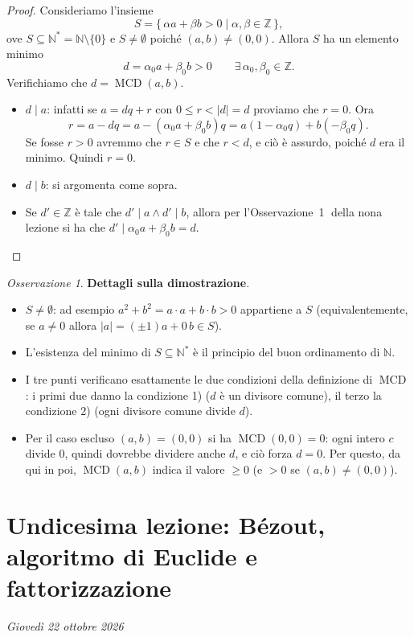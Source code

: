 \documentclass[11pt,a4paper]{article}
\newcommand{\N}{\mathbb{N}}
\newcommand{\Z}{\mathbb{Z}}
\theoremstyle{definition}
\theoremstyle{plain}
\theoremstyle{remark}
\newtheorem*{osservazione}{Osservazione}
\begin{document}
\begin{proof}
Consideriamo l'insieme
\[
S=\{\,\alpha a+\beta b>0\mid\alpha,\beta\in\Z\,\},
\]
ove $S\subseteq\N^*=\N\setminus\{0\}$ e $S\neq\emptyset$ poiché $(a,b)\neq(0,0)$. Allora $S$ ha un elemento minimo
\[
d=\alpha_0a+\beta_0b>0\qquad\exists\,\alpha_0,\beta_0\in\Z .
\]
Verifichiamo che $d=\operatorname{MCD}(a,b)$.
\begin{itemize}
\item $d\mid a$: infatti se $a=dq+r$ con $0\le r<|d|=d$ proviamo che $r=0$. Ora
\[
r=a-dq=a-(\alpha_0a+\beta_0b)q=a(1-\alpha_0q)+b(-\beta_0q).
\]
Se fosse $r>0$ avremmo che $r\in S$ e che $r<d$, e ciò è assurdo, poiché $d$ era il minimo. Quindi $r=0$.
\item $d\mid b$: si argomenta come sopra.
\item Se $d'\in\Z$ è tale che $d'\mid a\wedge d'\mid b$, allora per l'Osservazione~\textcircled{\small1} della nona lezione si ha che $d'\mid\alpha_0a+\beta_0b=d$. \qedhere
\end{itemize}
\end{proof}

\begin{osservazione}
\textbf{Dettagli sulla dimostrazione}. 
\begin{itemize}[nosep]
\item $S\neq\emptyset$: ad esempio $a^2+b^2=a\cdot a+b\cdot b>0$ appartiene a $S$ (equivalentemente, se $a\neq0$ allora $|a|=(\pm1)a+0\,b\in S$).
\item L'esistenza del minimo di $S\subseteq\N^*$ è il principio del buon ordinamento di $\N$.
\item I tre punti verificano esattamente le due condizioni della definizione di $\operatorname{MCD}$: i primi due danno la condizione 1) ($d$ è un divisore comune), il terzo la condizione 2) (ogni divisore comune divide $d$).
\item Per il caso escluso $(a,b)=(0,0)$ si ha $\operatorname{MCD}(0,0)=0$: ogni intero $c$ divide $0$, quindi dovrebbe dividere anche $d$, e ciò forza $d=0$. Per questo, da qui in poi, $\operatorname{MCD}(a,b)$ indica il valore $\ge0$ (e $>0$ se $(a,b)\neq(0,0)$).
\end{itemize}
\end{osservazione}


\section{Undicesima lezione: Bézout, algoritmo di Euclide e fattorizzazione}
\textit{Giovedì 22 ottobre 2026}
\end{document}
